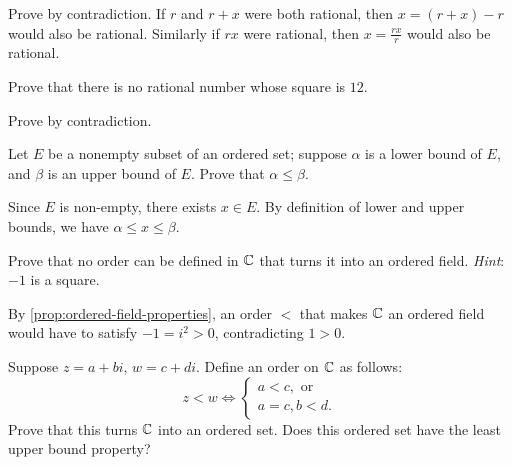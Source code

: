 \begin{solution}
Prove by contradiction. If $r$ and $r+x$ were both rational, then $x=(r+x)-r$ would also be rational. Similarly if $rx$ were rational, then $x=\frac{rx}{r}$ would also be rational.
\end{solution}

\begin{exercise}
Prove that there is no rational number whose square is $12$.
\end{exercise}

\begin{solution}
Prove by contradiction.
\end{solution}

\begin{exercise}
Let $E$ be a nonempty subset of an ordered set; suppose $\alpha$ is a lower bound of $E$, and $\beta$ is an upper bound of $E$. Prove that $\alpha\le\beta$.
\end{exercise}

\begin{solution}
Since $E$ is non-empty, there exists $x\in E$. By definition of lower and upper bounds, we have $\alpha\le x\le\beta$.
\end{solution}

\begin{exercise}
Prove that no order can be defined in $\mathbb C$ that turns it into an ordered field. \emph{Hint}: $-1$ is a square.
\end{exercise}

\begin{solution}
By \cref{prop:ordered-field-properties}, an order $<$ that makes $\mathbb C$ an ordered field would have to satisfy $-1=i^2>0$, contradicting $1>0$.
\end{solution}

\begin{exercise}
Suppose $z=a+bi$, $w=c+di$. Define an order on $\mathbb C$ as follows:
\[z<w\iff\begin{cases}
a<c,\text{ or}\\
a=c,b<d.
\end{cases}\]
Prove that this turns $\mathbb C$ into an ordered set. Does this ordered set have the least upper bound property?
\end{exercise}

